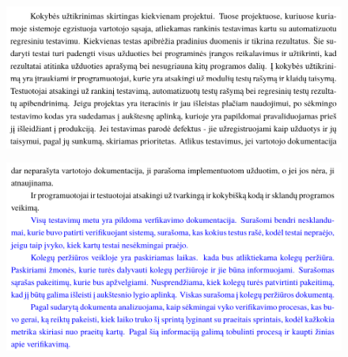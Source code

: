 \documentclass{VUMIFPSkursinis}
\begin{document}
				\begin{figure}[!htbp]
					\includegraphics[scale=0.8]{img/kokybepotwo}
					
					\label{img:ProfilisPo}
				\end{figure}
				\begin{figure}[!htbp]
					\includegraphics[scale=0.8]{img/kokybepothree}
					\label{img:ProfilisPo}
				\end{figure}

\pagebreak
\end{document}
